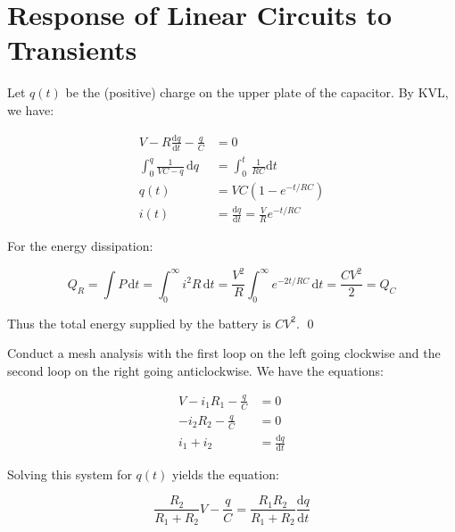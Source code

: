 \documentclass[12pt]{article}
\begin{document}



\pagebreak
\section*{Response of Linear Circuits to Transients}



Let $q(t)$ be the (positive) charge on the upper plate of the capacitor. By KVL, we have:

\begin{equation}
\begin{split}
    V - R \frac{\mathrm{d}q}{\mathrm{d}t} - \frac{q}{C} &= 0 \\
    \int_{0}^{q} \frac{1}{VC - q} \, \mathrm{d}q &= \int_{0}^{t} \, \frac{1}{RC} \mathrm{d}t \\
    q(t) &= VC (1 - e^{-t/RC}) \\
    i(t) &= \frac{\mathrm{d}q}{\mathrm{d}t} = \frac{V}{R} e^{-t/RC}
\end{split}
\end{equation}

For the energy dissipation:

\begin{equation}
    Q_{R} = \int P \, \mathrm{d}t = \int_{0}^{\infty} i^{2}R \, \mathrm{d}t = \frac{V^{2}}{R} \int_{0}^{\infty} e^{-2t/RC} \, \mathrm{d}t = \frac{CV^{2}}{2} = Q_{C}
\end{equation}

Thus the total energy supplied by the battery is $CV^{2}$.
\qed


Conduct a mesh analysis with the first loop on the left going clockwise and the second loop on the right going anticlockwise. We have the equations:

\begin{equation}
\begin{split}
    V - i_{1}R_{1} - \frac{q}{C} &= 0 \\
    -i_{2}R_{2} - \frac{q}{C} &= 0 \\
    i_{1} + i_{2} &= \frac{\mathrm{d}q}{\mathrm{d}t}
\end{split}
\end{equation}

Solving this system for $q(t)$ yields the equation:

\begin{equation}
    \frac{R_{2}}{R_{1} + R_{2}} V - \frac{q}{C} = \frac{R_{1} R_{2}}{R_{1} + R_{2}} \frac{\mathrm{d}q}{\mathrm{d}t}
\end{equation}
\end{document}

